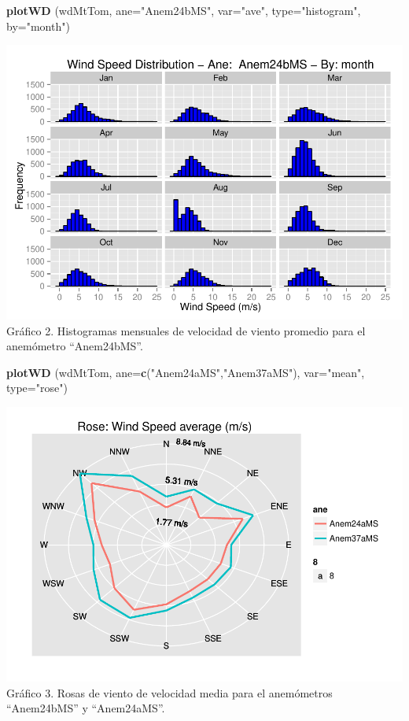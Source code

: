 \documentclass[]{article}
\newenvironment{Shaded}{\begin{snugshade}}{\end{snugshade}}
\newcommand{\KeywordTok}[1]{\textcolor[rgb]{0.13,0.29,0.53}{\textbf{{#1}}}}
\newcommand{\DataTypeTok}[1]{\textcolor[rgb]{0.13,0.29,0.53}{{#1}}}
\newcommand{\StringTok}[1]{\textcolor[rgb]{0.31,0.60,0.02}{{#1}}}
\newcommand{\NormalTok}[1]{{#1}}
\begin{document}
\begin{Shaded}
\begin{Highlighting}[]
\KeywordTok{plotWD} \NormalTok{(wdMtTom, }\DataTypeTok{ane=}\StringTok{"Anem24bMS"}\NormalTok{, }\DataTypeTok{var=}\StringTok{"ave"}\NormalTok{, }\DataTypeTok{type=}\StringTok{"histogram"}\NormalTok{, }\DataTypeTok{by=}\StringTok{"month"}\NormalTok{)}
\end{Highlighting}
\end{Shaded}

\includegraphics{Manual_WindResource_files/figure-latex/unnamed-chunk-10-1.pdf}
Gráfico 2. Histogramas mensuales de velocidad de viento promedio para el
anemómetro ``Anem24bMS''.

\begin{Shaded}
\begin{Highlighting}[]
\KeywordTok{plotWD} \NormalTok{(wdMtTom, }\DataTypeTok{ane=}\KeywordTok{c}\NormalTok{(}\StringTok{"Anem24aMS"}\NormalTok{,}\StringTok{"Anem37aMS"}\NormalTok{), }\DataTypeTok{var=}\StringTok{"mean"}\NormalTok{, }\DataTypeTok{type=}\StringTok{"rose"}\NormalTok{)}
\end{Highlighting}
\end{Shaded}

\includegraphics{Manual_WindResource_files/figure-latex/unnamed-chunk-11-1.pdf}
Gráfico 3. Rosas de viento de velocidad media para el anemómetros
``Anem24bMS'' y ``Anem24aMS''.
\end{document}
